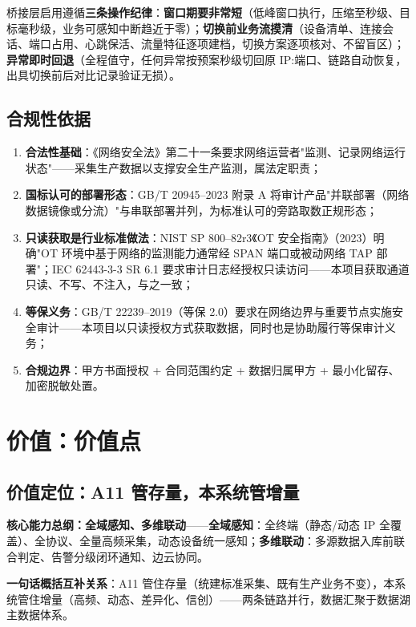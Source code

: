 \documentclass[11pt,a4paper]{ctexart}
\begin{document}
桥接层启用遵循\textbf{三条操作纪律}：\textbf{窗口期要非常短}（低峰窗口执行，压缩至秒级、目标毫秒级，业务可感知中断趋近于零）；\textbf{切换前业务流摸清}（设备清单、连接会话、端口占用、心跳保活、流量特征逐项建档，切换方案逐项核对、不留盲区）；\textbf{异常即时回退}（全程值守，任何异常按预案秒级切回原 IP:端口、链路自动恢复，出具切换前后对比记录验证无损）。

\subsection{合规性依据}

\begin{enumerate}[leftmargin=*]
  \item \textbf{合法性基础}：《网络安全法》第二十一条要求网络运营者"监测、记录网络运行状态"——采集生产数据以支撑安全生产监测，属法定职责；
  \item \textbf{国标认可的部署形态}：GB/T 20945--2023 附录 A 将审计产品"并联部署（网络数据镜像或分流）"与串联部署并列，为标准认可的旁路取数正规形态；
  \item \textbf{只读获取是行业标准做法}：NIST SP 800--82r3《OT 安全指南》（2023）明确"OT 环境中基于网络的监测能力通常经 SPAN 端口或被动网络 TAP 部署"；IEC 62443-3-3 SR 6.1 要求审计日志经授权只读访问——本项目获取通道只读、不写、不注入，与之一致；
  \item \textbf{等保义务}：GB/T 22239--2019（等保 2.0）要求在网络边界与重要节点实施安全审计——本项目以只读授权方式获取数据，同时也是协助履行等保审计义务；
  \item \textbf{合规边界}：甲方书面授权 + 合同范围约定 + 数据归属甲方 + 最小化留存、加密脱敏处置。
\end{enumerate}

\section{价值：价值点}

\subsection{价值定位：A11 管存量，本系统管增量}

\textbf{核心能力总纲：全域感知、多维联动}——\textbf{全域感知}：全终端（静态/动态 IP 全覆盖）、全协议、全量高频采集，动态设备统一感知；\textbf{多维联动}：多源数据入库前联合判定、告警分级闭环通知、边云协同。

\textbf{一句话概括互补关系}：A11 管住存量（统建标准采集、既有生产业务不变），本系统管住增量（高频、动态、差异化、信创）——两条链路并行，数据汇聚于数据湖主数据体系。
\end{document}
